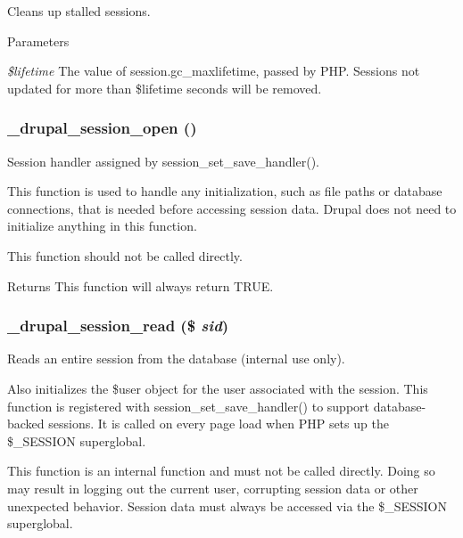 Cleans up stalled sessions.


\begin{DoxyParams}{Parameters}
\item[{\em \$lifetime}]The value of session.gc\_\-maxlifetime, passed by PHP. Sessions not updated for more than \$lifetime seconds will be removed. \end{DoxyParams}
\hypertarget{session_8inc_ac8852f85f169dfbee885d44239a6048c}{
\subsubsection[{\_\-drupal\_\-session\_\-open}]{\setlength{\rightskip}{0pt plus 5cm}\_\-drupal\_\-session\_\-open ()}}
\label{session_8inc_ac8852f85f169dfbee885d44239a6048c}
Session handler assigned by session\_\-set\_\-save\_\-handler().

This function is used to handle any initialization, such as file paths or database connections, that is needed before accessing session data. Drupal does not need to initialize anything in this function.

This function should not be called directly.

\begin{DoxyReturn}{Returns}
This function will always return TRUE. 
\end{DoxyReturn}
\hypertarget{session_8inc_aeb991b6399401804bd0072e5ee6e4741}{
\subsubsection[{\_\-drupal\_\-session\_\-read}]{\setlength{\rightskip}{0pt plus 5cm}\_\-drupal\_\-session\_\-read (\$ {\em sid})}}
\label{session_8inc_aeb991b6399401804bd0072e5ee6e4741}
Reads an entire session from the database (internal use only).

Also initializes the \$user object for the user associated with the session. This function is registered with session\_\-set\_\-save\_\-handler() to support database-\/backed sessions. It is called on every page load when PHP sets up the \$\_\-SESSION superglobal.

This function is an internal function and must not be called directly. Doing so may result in logging out the current user, corrupting session data or other unexpected behavior. Session data must always be accessed via the \$\_\-SESSION superglobal.


